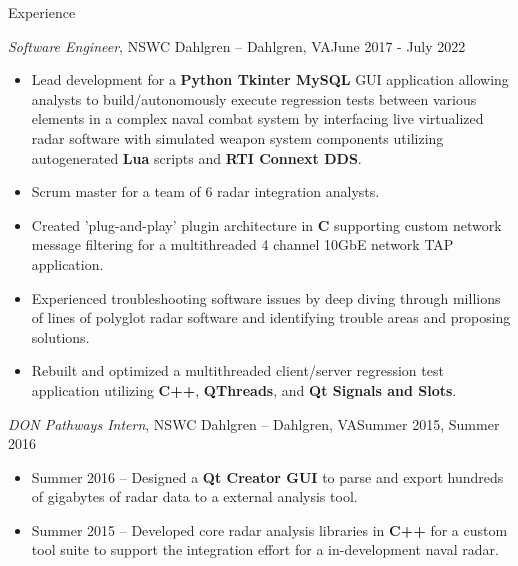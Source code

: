 \documentclass[calibri]{mcdowellcv}
\begin{document}
	\makeheader
	
	\begin{cvsection}{Experience}
		\begin{cvsubsection}{\textit{Software Engineer}, NSWC Dahlgren -- Dahlgren, VA}{June 2017 - July 2022}
			\begin{itemize}
				\item Lead development for a \textbf{Python Tkinter MySQL} GUI application allowing analysts to build/autonomously execute regression tests between various elements in a complex naval combat system by interfacing live virtualized radar software with simulated weapon system components utilizing autogenerated \textbf{Lua} scripts and \textbf{RTI Connext DDS}. 
				\item Scrum master for a team of 6 radar integration analysts.
				\item Created 'plug-and-play' plugin architecture in \textbf{C} supporting custom network message filtering for a multithreaded 4 channel 10GbE network TAP application.  
				\item Experienced troubleshooting software issues by deep diving through millions of lines of polyglot radar software and identifying trouble areas and proposing solutions.  
				\item Rebuilt and optimized a multithreaded client/server regression test application utilizing \textbf{C++}, \textbf{QThreads}, and \textbf{Qt Signals and Slots}.   
			\end{itemize}
		\end{cvsubsection}
		
		\begin{cvsubsection}{\textit{DON Pathways Intern}, NSWC Dahlgren -- Dahlgren, VA}{Summer 2015, Summer 2016}	
			\begin{itemize}
				\item Summer 2016 -- Designed a \textbf{Qt Creator GUI} to parse and export hundreds of gigabytes of radar data to a external analysis tool.  
				\item Summer 2015 -- Developed core radar analysis libraries in \textbf{C++} for a custom tool suite to support the integration effort for a in-development naval radar.  
			\end{itemize}
		\end{cvsubsection}
	\end{cvsection}
	
\end{document}
